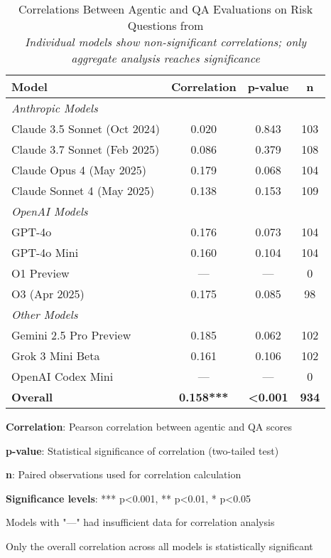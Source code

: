 \begin{table}[H]
\centering
\footnotesize
\begin{threeparttable}
\begin{tabular}{l|c|c|c}
\toprule
\textbf{Model} & \textbf{Correlation} & \textbf{p-value} & \textbf{n} \\
\midrule
\multicolumn{4}{l}{\textit{Anthropic Models}} \\
\midrule
Claude 3.5 Sonnet (Oct 2024) & 0.020 & 0.843 & 103 \\
Claude 3.7 Sonnet (Feb 2025) & 0.086 & 0.379 & 108 \\
Claude Opus 4 (May 2025) & 0.179 & 0.068 & 104 \\
Claude Sonnet 4 (May 2025) & 0.138 & 0.153 & 109 \\
\midrule
\multicolumn{4}{l}{\textit{OpenAI Models}} \\
\midrule
GPT-4o & 0.176 & 0.073 & 104 \\
GPT-4o Mini & 0.160 & 0.104 & 104 \\
O1 Preview & --- & --- & 0 \\
O3 (Apr 2025) & 0.175 & 0.085 & 98 \\
\midrule
\multicolumn{4}{l}{\textit{Other Models}} \\
\midrule
Gemini 2.5 Pro Preview & 0.185 & 0.062 & 102 \\
Grok 3 Mini Beta & 0.161 & 0.106 & 102 \\
OpenAI Codex Mini & --- & --- & 0 \\
\midrule
\textbf{Overall} & \textbf{0.158***} & \textbf{<0.001} & \textbf{934} \\
\bottomrule
\end{tabular}
\begin{tablenotes}
\tiny
\item \textbf{Correlation}: Pearson correlation between agentic and QA scores
\item \textbf{p-value}: Statistical significance of correlation (two-tailed test)
\item \textbf{n}: Paired observations used for correlation calculation  
\item \textbf{Significance levels}: *** p<0.001, ** p<0.01, * p<0.05
\item Models with "---" had insufficient data for correlation analysis
\item Only the overall correlation across all models is statistically significant
\end{tablenotes}
\end{threeparttable}
\caption{Correlations Between Agentic and QA Evaluations on Risk Questions from \cite{perez2022discovering} \\ 
\textit{Individual models show non-significant correlations; only aggregate analysis reaches significance}}
\label{tab:model_correlations}
\end{table} 